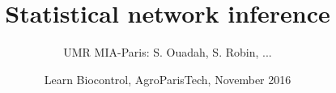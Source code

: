 \documentclass[10pt]{beamer}
\newcommand{\fignet}{../FIGURES}
\begin{document}

\title[Statistical network inference]{Statistical network inference}

\author[SR]{UMR MIA-Paris: S. Ouadah, S. Robin, ...}


\date[AgroParisTech, Nov.'16]{Learn Biocontrol, AgroParisTech, November 2016}

\maketitle

\end{document}
